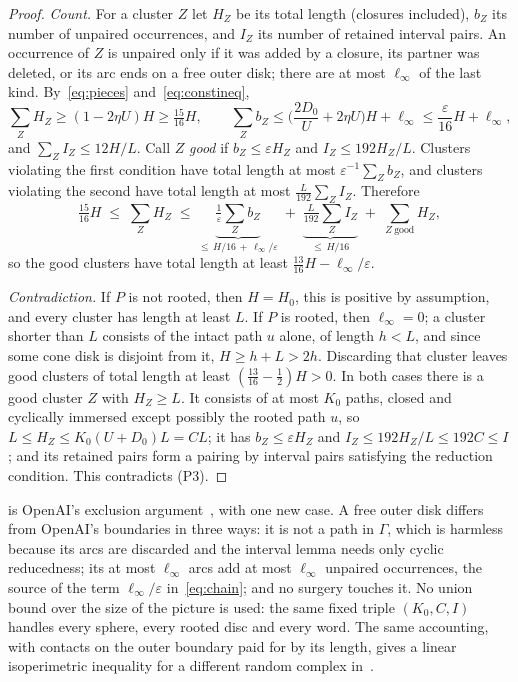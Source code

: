 \documentclass[11pt]{article}
\theoremstyle{definition}
\theoremstyle{plain}
\newcommand{\eps}{\varepsilon}
\begin{document}
\begin{proof}
\emph{Count.} For a cluster $Z$ let $H_Z$ be its total length (closures included), $b_Z$ its number of unpaired occurrences, and $I_Z$ its number of retained interval pairs. An occurrence of $Z$ is unpaired only if it was added by a closure, its partner was deleted, or its arc ends on a free outer disk; there are at most $\ell_\infty$ of the last kind. By~\eqref{eq:pieces} and~\eqref{eq:constineq},
\[
\sum_Z H_Z\ge(1-2\eta U)H\ge\tfrac{15}{16}H,\qquad
\sum_Z b_Z\le\Big(\frac{2D_0}{U}+2\eta U\Big)H+\ell_\infty\le\frac{\eps}{16}H+\ell_\infty,
\]
and $\sum_Z I_Z\le12H/L$. Call $Z$ \emph{good} if $b_Z\le\eps H_Z$ and $I_Z\le192H_Z/L$. Clusters violating the first condition have total length at most $\eps^{-1}\sum_Zb_Z$, and clusters violating the second have total length at most $\frac{L}{192}\sum_ZI_Z$. Therefore
\begin{equation}\label{eq:chain}
\tfrac{15}{16}H\;\le\;\sum_Z H_Z\;\le\;\underbrace{\tfrac1\eps\textstyle\sum_Z b_Z}_{\le\, H/16\,+\,\ell_\infty/\eps}\;+\;\underbrace{\tfrac{L}{192}\textstyle\sum_Z I_Z}_{\le\, H/16}\;+\;\sum_{Z\ \mathrm{good}}H_Z ,
\end{equation}
so the good clusters have total length at least $\frac{13}{16}H-\ell_\infty/\eps$.

\emph{Contradiction.} If $P$ is not rooted, then $H=H_0$, this is positive by assumption, and every cluster has length at least $L$. If $P$ is rooted, then $\ell_\infty=0$; a cluster shorter than $L$ consists of the intact path $u$ alone, of length $h<L$, and since some cone disk is disjoint from it, $H\ge h+L>2h$. Discarding that cluster leaves good clusters of total length at least $(\frac{13}{16}-\frac12)H>0$. In both cases there is a good cluster $Z$ with $H_Z\ge L$. It consists of at most $K_0$ paths, closed and cyclically immersed except possibly the rooted path $u$, so $L\le H_Z\le K_0(U+D_0)L=CL$; it has $b_Z\le\eps H_Z$ and $I_Z\le192H_Z/L\le192C\le I$; and its retained pairs form a pairing by interval pairs satisfying the reduction condition. This contradicts (P3).
\end{proof}

\begin{remark}\label{rem:diff}
 is OpenAI's exclusion argument~\cite[Prop.~4.5]{OAI196}, \cite[Thm.~5.2]{OAI197a} with one new case. A free outer disk differs from OpenAI's boundaries in three ways: it is not a path in $\Gamma$, which is harmless because its arcs are discarded and the interval lemma needs only cyclic reducedness; its at most $\ell_\infty$ arcs add at most $\ell_\infty$ unpaired occurrences, the source of the term $\ell_\infty/\eps$ in~\eqref{eq:chain}; and no surgery touches it. No union bound over the size of the picture is used: the same fixed triple $(K_0,C,I)$ handles every sphere, every rooted disc and every word. The same accounting, with contacts on the outer boundary paid for by its length, gives a linear isoperimetric inequality for a different random complex in~\cite[Thm.~3.1 and Lemma~3.8]{OAI257}.
\end{remark}
\end{document}
